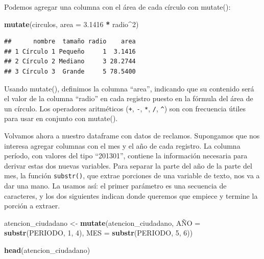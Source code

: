 \documentclass[]{book}
\newenvironment{Shaded}{\begin{snugshade}}{\end{snugshade}}
\newcommand{\KeywordTok}[1]{\textcolor[rgb]{0.13,0.29,0.53}{\textbf{#1}}}
\newcommand{\DataTypeTok}[1]{\textcolor[rgb]{0.13,0.29,0.53}{#1}}
\newcommand{\DecValTok}[1]{\textcolor[rgb]{0.00,0.00,0.81}{#1}}
\newcommand{\FloatTok}[1]{\textcolor[rgb]{0.00,0.00,0.81}{#1}}
\newcommand{\StringTok}[1]{\textcolor[rgb]{0.31,0.60,0.02}{#1}}
\newcommand{\OperatorTok}[1]{\textcolor[rgb]{0.81,0.36,0.00}{\textbf{#1}}}
\newcommand{\NormalTok}[1]{#1}
\begin{document}
Podemos agregar una columna con el área de cada círculo con mutate():

\begin{Shaded}
\begin{Highlighting}[]
\KeywordTok{mutate}\NormalTok{(circulos, }\DataTypeTok{area =} \FloatTok{3.1416} \OperatorTok{*}\StringTok{ }\NormalTok{radio}\OperatorTok{^}\DecValTok{2}\NormalTok{)}
\end{Highlighting}
\end{Shaded}

\begin{verbatim}
##      nombre  tamaño radio    area
## 1 Círculo 1 Pequeño     1  3.1416
## 2 Círculo 2 Mediano     3 28.2744
## 3 Círculo 3  Grande     5 78.5400
\end{verbatim}

Usando mutate(), definimos la columna ``area'', indicando que su
contenido será el valor de la columna ``radio'' en cada registro puesto
en la fórmula del área de un círculo. Los operadores aritméticos
(\texttt{+}, \texttt{-}, \texttt{*}, \texttt{/}, \texttt{\^{}}) son con
frecuencia útiles para usar en conjunto con mutate().

Volvamos ahora a nuestro dataframe con datos de reclamos. Supongamos que
nos interesa agregar columnas con el mes y el año de cada registro. La
columna período, con valores del tipo ``201301'', contiene la
información necesaria para derivar estas dos nuevas variables. Para
separar la parte del año de la parte del mes, la función
\texttt{substr()}, que extrae porciones de una variable de texto, nos va
a dar una mano. La usamos así: el primer parámetro es una secuencia de
caracteres, y los dos siguientes indican donde queremos que empiece y
termine la porción a extraer.

\begin{Shaded}
\begin{Highlighting}[]
\NormalTok{atencion_ciudadano <-}\StringTok{ }\KeywordTok{mutate}\NormalTok{(atencion_ciudadano,}
\NormalTok{                             AÑ}\DataTypeTok{O =} \KeywordTok{substr}\NormalTok{(PERIODO, }\DecValTok{1}\NormalTok{, }\DecValTok{4}\NormalTok{),}
                             \DataTypeTok{MES =} \KeywordTok{substr}\NormalTok{(PERIODO, }\DecValTok{5}\NormalTok{, }\DecValTok{6}\NormalTok{))}
                                
\KeywordTok{head}\NormalTok{(atencion_ciudadano) }
\end{Highlighting}
\end{Shaded}
\end{document}
